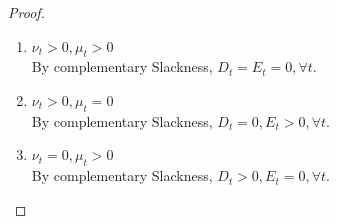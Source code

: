 \documentclass{article}
\begin{document}
\begin{enumerate}
\begin{enumerate}
\begin{proof}
\begin{enumerate}[label=(\roman*)]
                    \item $\nu_t>0,\mu_t>0$\\ 
                    By complementary Slackness, $D_t=E_t=0,\forall t$.
                    \item $\nu_t>0,\mu_t=0$\\ 
                    By complementary Slackness, $D_t=0,E_t>0,\forall t$.
                    \item $\nu_t=0,\mu_t>0$\\ 
                    By complementary Slackness, $D_t>0,E_t=0,\forall t$.
                \end{enumerate}
            \end{proof}
        \end{enumerate}
    \end{enumerate}
    
\end{document}
